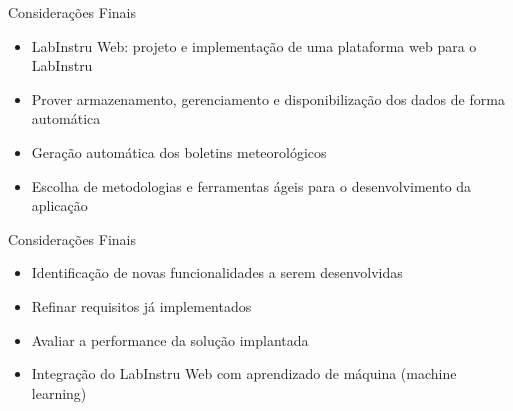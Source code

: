 \begin{frame}{Considerações Finais}
\begin{itemize}
\item LabInstru Web: projeto e implementação de uma \alert{plataforma web} para o LabInstru
\ \ \newline
\item Prover armazenamento, gerenciamento e disponibilização dos dados de forma automática
\ \ \newline
\item Geração automática dos boletins meteorológicos
\ \ \newline
\item Escolha de metodologias e ferramentas ágeis para o desenvolvimento da aplicação
\end{itemize}
\end{frame}

\begin{frame}{Considerações Finais}
\begin{itemize}
\item Identificação de novas funcionalidades a serem desenvolvidas
\ \ \newline
\item Refinar requisitos já implementados
\ \ \newline
\item Avaliar a performance da solução implantada
\ \ \newline
\item Integração do LabInstru Web com aprendizado de máquina (\alert{machine learning})
\end{itemize}
\end{frame}

\maketitle
